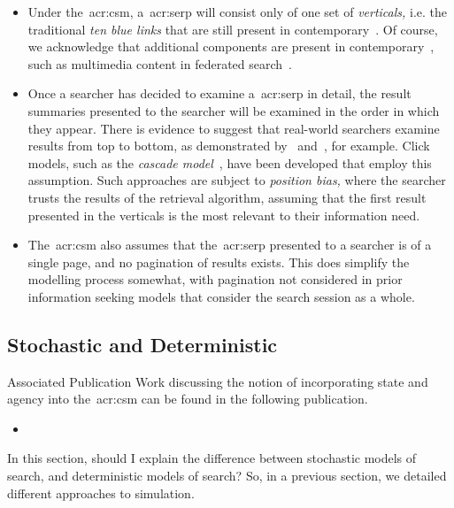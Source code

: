 \begin{itemize}
    \item{ Under the~\gls{acr:csm}, a~\gls{acr:serp} will consist only of one set of \emph{verticals,} i.e. the traditional \emph{ten blue links} that are still present in contemporary~. Of course, we acknowledge that additional components are present in contemporary~, such as multimedia content in federated search~\citep{chen2012federated_search_click_model}.}
    \item{ Once a searcher has decided to examine a~\gls{acr:serp} in detail, the result summaries presented to the searcher will be examined in the order in which they appear. There is evidence to suggest that real-world searchers examine results from top to bottom, as demonstrated by~\cite{joachims2002click_model} and~\cite{joachims2005click_model}, for example. Click models, such as the \emph{cascade model}~\citep{craswell2008click_models}, have been developed that employ this assumption. Such approaches are subject to \emph{position bias,} where the searcher trusts the results of the retrieval algorithm, assuming that the first result presented in the verticals is the most relevant to their information need.}
    \item{ The~\gls{acr:csm} also assumes that the~\gls{acr:serp} presented to a searcher is of a single page, and no pagination of results exists. This does simplify the modelling process somewhat, with pagination not considered in prior information seeking models that consider the search session as a whole.}
\end{itemize}

\subsection{Stochastic and Deterministic}
\begin{publications_box}{Associated Publication}
Work discussing the notion of incorporating state and agency into the~\gls{acr:csm} can be found in the following publication.
\vspace*{-2mm}
\begin{itemize}
    \item{}
\end{itemize}
\end{publications_box}

In this section, should I explain the difference between stochastic models of search, and deterministic models of search?
So, in a previous section, we detailed different approaches to simulation.

